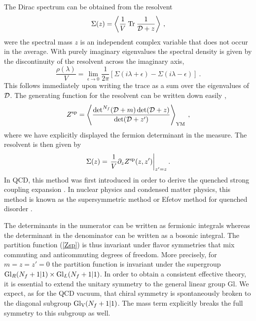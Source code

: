 The Dirac spectrum can be obtained from the resolvent
\begin{equation}
  \Sigma(z) =\left\langle \frac 1V\: {\rm Tr\:} \frac 1{{\cal D}+z} \right
  \rangle\:, 
\end{equation}
were the spectral mass $z$ is an independent complex variable that
does not occur in the average. With purely imaginary eigenvalues the
spectral density is given by the discontinuity of the resolvent across
the imaginary axis,
\begin{equation}
  \frac {\rho(\lambda)}V = \lim_{\epsilon\to0}\frac 1{2\pi}
  [ \Sigma(i\lambda +\epsilon) - \Sigma(i\lambda -\epsilon)]\:.
  \label{discon}
\end{equation}
This follows immediately upon writing the trace as a sum over the
eigenvalues of ${\cal D}$.  The generating function for the resolvent
can be written down easily \cite{Vminn},
\begin{equation}
  Z^{\rm sp} = \left \langle \frac {{\det}^{N_f}({\cal D}+m)
      \det({\cal D}+z)}{\det({\cal D}+z')} \right \rangle_{\rm YM}\:,
  \label{Zsp}
\end{equation}
where we have explicitly displayed the fermion determinant in the
measure.  The resolvent is then given by
\begin{equation}
  \Sigma(z) = \left. \frac 1V \partial_z Z^{\rm sp}(z,z')\right|_{z'=z}.
  \label{resol}
\end{equation}
In QCD, this method was first introduced in order to derive the
quenched strong coupling expansion \cite{Morel}. In nuclear physics
and condensed matter physics, this method is known as the
supersymmetric method or Efetov method for quenched disorder
\cite{Brezin,Efetov,VWZ}.

The determinants in the numerator can be written as fermionic
integrals where\-as the determinant in the denominator can be written
as a bosonic integral. The partition function (\ref{Zsp}) is thus
invariant under flavor symmetries that mix commuting and
anticommuting degrees of freedom. More precisely, for $m=z=z'=0$ the
partition function is invariant under the supergroup ${\rm
  Gl}_R(N_f+1|1) \times {\rm Gl}_L(N_f+1|1)$. In order to obtain a
consistent effective theory, it is essential to extend the unitary
symmetry to the general linear group Gl. We expect, as for the
QCD vacuum, that chiral symmetry is spontaneously broken to
the diagonal subgroup ${\rm Gl}_{\rm V}(N_f+1|1)$.  The mass term explicitly
breaks the full symmetry to this subgroup as well.
 
